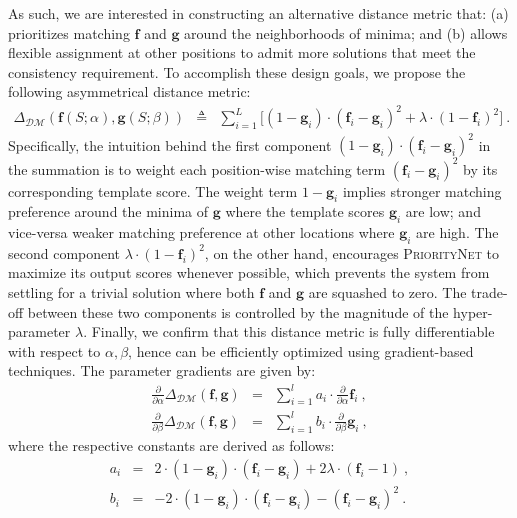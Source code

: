 As such, we are interested in constructing an alternative distance metric that: (a) prioritizes matching $\mathbf{f}$ and $\mathbf{g}$ around the neighborhoods of minima; and (b) allows flexible assignment at other positions to admit more solutions that meet the consistency requirement. To accomplish these design goals, we propose the following asymmetrical distance metric:
\begin{eqnarray}
\Delta_{\mathcal{DM}}(\mathbf{f}(S; \alpha),\mathbf{g}(S; \beta)) &\triangleq& \sum_{i=1}^{L} \Big[(1  - \mathbf{g}_i) \cdot (\mathbf{f}_i - \mathbf{g}_i)^2 + \lambda \cdot(1-\mathbf{f}_i)^2 \Big] \ .
\label{eq:divfunc}
\end{eqnarray}
Specifically, the intuition behind the first component $(1 - \mathbf{g}_i) \cdot (\mathbf{f}_i - \mathbf{g}_i)^2$ in the summation is to weight each position-wise matching term $(\mathbf{f}_i - \mathbf{g}_i)^2$ by its corresponding template score. The weight term $1 - \mathbf{g}_i$ implies stronger matching preference around the minima of $\mathbf{g}$ where the template scores $\mathbf{g}_i$ are low; and vice-versa weaker matching preference at other locations where $\mathbf{g}_i$ are high. The second component $\lambda\cdot(1-\mathbf{f}_i)^2$, on the other hand, encourages \textsc{PriorityNet} to maximize its output scores whenever possible, which prevents the system from settling for a trivial solution where both $\mathbf{f}$ and $\mathbf{g}$ are squashed to zero. The trade-off between these two components is controlled by the magnitude of the hyper-parameter $\lambda$. Finally, we confirm that this distance metric is fully differentiable with respect to $\alpha, \beta$, hence can be efficiently optimized using gradient-based techniques. The parameter gradients are given by:
\begin{eqnarray}
\frac{\partial}{\partial \alpha} \Delta_{\mathcal{DM}}(\mathbf{f,g}) &=& \sum_{i=1}^l a_i \cdot \frac{\partial}{\partial \alpha}\mathbf{f}_i \ , \nonumber \\
\frac{\partial}{\partial \beta} \Delta_{\mathcal{DM}}(\mathbf{f,g}) &=& \sum_{i=1}^l b_i \cdot \frac{\partial}{\partial \beta}\mathbf{g}_i \ ,
\end{eqnarray} 
where the respective constants are derived as follows:
\begin{eqnarray}
a_i &=& 2\cdot(1-\mathbf{g}_i)\cdot(\mathbf{f}_i - \mathbf{g}_i) + 2\lambda\cdot(\mathbf{f}_i - 1) \ , \nonumber \\
b_i &=& -2\cdot (1-\mathbf{g}_i)\cdot(\mathbf{f}_i - \mathbf{g}_i) - (\mathbf{f}_i - \mathbf{g}_i)^2 \ .
\end{eqnarray}
